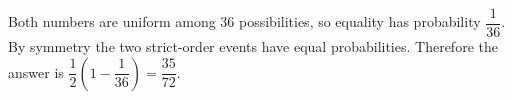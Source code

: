 Both numbers are uniform among $36$ possibilities, so equality has probability $\dfrac{1}{36}$. By symmetry the two strict-order events have equal probabilities. Therefore the answer is $\dfrac{1}{2}(1-\dfrac{1}{36})=\boxed{\dfrac{35}{72}}$.
